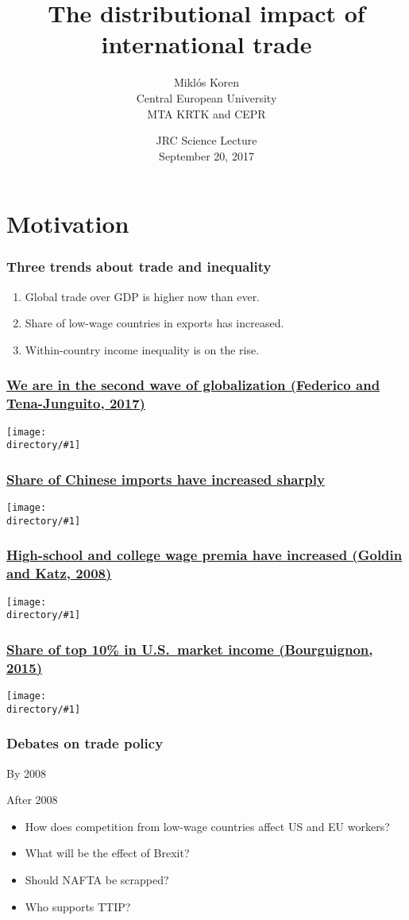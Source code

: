 \documentclass[aspectratio=169,compress,mathserif]{beamer}
\title{The distributional impact of international trade}
\author{Miklós Koren\\Central European University\\MTA KRTK and CEPR}
\date %
{JRC Science Lecture\\September 20, 2017}
\newcommand{\directory}{./exhibits}
\newcommand{\widefigure}[2]{\begin{frame}\frametitle{\hyperlink{#1back}{#2}}\hypertarget{#1}{{\begin{center}\texttt{[image: \\directory/\#1]}\end{center}}}\end{frame}}
\newcommand{\longfigure}[2]{\begin{frame}\frametitle{\hyperlink{#1back}{#2}}\hypertarget{#1}{{\begin{center}\texttt{[image: \\directory/\#1]}\end{center}}}\end{frame}}
\begin{document}
\begin{frame}[plain]
  \titlepage
    \addtocounter{framenumber}{-1}
\end{frame}






\section{Motivation}\hypertarget{Motivation}{}


\begin{frame}\frametitle{Three trends about trade and inequality}\hypertarget{Three trends about trade and inequality}{}
\begin{enumerate}\setcounter{enumi}{0}
\item Global trade over GDP is higher now than ever.

\item Share of low-wage countries in exports has increased.

\item Within-country income inequality is on the rise.


\end{enumerate}
\end{frame}




\widefigure{openness-1830}{We are in the second wave of globalization (Federico and Tena-Junguito, 2017)}
\longfigure{china-share}{Share of Chinese imports have increased sharply}
\longfigure{highschool-premium}{High-school and college wage premia have increased (Goldin and Katz, 2008)}
\longfigure{top10-share}{Share of top 10\% in U.S.~market income (Bourguignon, 2015)}


\begin{frame}\frametitle{Debates on trade policy}\hypertarget{Debates on trade policy}{}
\begin{block}{By 2008}\hypertarget{By 2008}{}
\pause


\end{block}
\begin{block}{After 2008}\hypertarget{After 2008}{}
\begin{itemize}
\item How does competition from low-wage countries affect US and EU workers?

\item What will be the effect of Brexit?

\item Should NAFTA be scrapped?

\item Who supports TTIP?


\end{itemize}
\end{block}
\end{frame}
\end{document}

